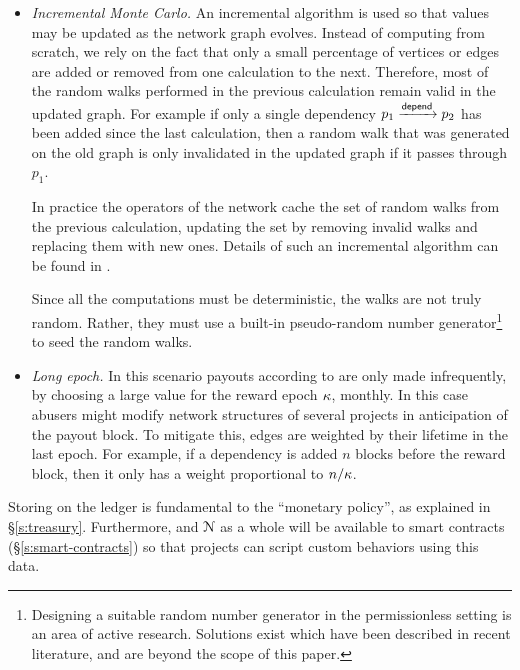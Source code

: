 \begin{itemize}
\item \emph{Incremental Monte Carlo.} An incremental algorithm is used so that
  \osrank{} values may be updated as the network graph evolves. Instead of
  computing \osrank{} from scratch, we rely on the fact that only a small
  percentage of vertices or edges are added or removed
  from one calculation to the next. Therefore, most of the random walks
  performed in the previous calculation remain valid in the updated graph. For
  example if only a single dependency $p_1 \xrightarrow[]{\mathsf{depend}} p_2$ has been
  added since the last calculation, then a random walk that was generated on the
  old graph is only invalidated in the updated graph if it passes through $p_1$.

  In practice the operators of the network cache the set of random
  walks from the previous calculation, updating the set by removing
  invalid walks and replacing them with new ones. Details of such an
  incremental \pagerank{} algorithm can be found
  in \cite{incr pagerank}.

  Since all the computations must be deterministic, the walks are not truly
  random. Rather, they must use a built-in pseudo-random number
  generator\footnote{Designing a suitable random number generator in the
  permissionless setting is an area of active research. Solutions exist
  which have been described in recent literature, and are beyond the
  scope of this paper.} to seed the random walks.

\item \emph{Long epoch.} In this scenario payouts according to
  \osrank{} are only made infrequently, by choosing a large value for the
  reward epoch $\kappa$, \eg{} monthly.  In this case
  abusers might modify network structures of several projects in
  anticipation of the payout block. To mitigate this, edges are
  weighted by their lifetime in the last epoch. For
  example, if a dependency is added $n$ blocks before the reward block,
  then it only has a weight proportional to $n/\kappa$.
\end{itemize}

\bigskip

\noindent Storing \osrank{} on the ledger is fundamental to the \oscoin{}
``monetary policy'', as explained in \S \ref{s:treasury}. Furthermore,
\osrank{} and $\mathcal{N}$ as a whole will be available to smart contracts
(\S\ref{s:smart-contracts}) so that projects can script custom behaviors using
this data.
